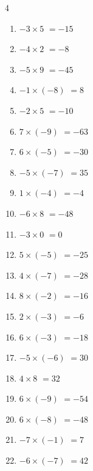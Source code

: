 \begin{multicols}{4}
\begin{enumerate}
  \item $-3\times 5$
        $=-15$

  \item $-4\times 2$
        $=-8$

  \item $-5\times 9$
        $=-45$

  \item $-1\times (-8)$
        $=8$

  \item $-2\times 5$
        $=-10$

  \item $7\times (-9)$
        $=-63$

  \item $6\times (-5)$
        $=-30$

  \item $-5\times (-7)$
        $=35$

  \item $1\times (-4)$
        $=-4$

  \item $-6\times 8$
        $=-48$

  \item $-3\times 0$
        $=0$

  \item $5\times (-5)$
        $=-25$

  \item $4\times (-7)$
        $=-28$

  \item $8\times (-2)$
        $=-16$

  \item $2\times (-3)$
        $=-6$

  \item $6\times (-3)$
        $=-18$

  \item $-5\times (-6)$
        $=30$

  \item $4\times 8$
        $=32$

\columnbreak %

\resetques

  \item $6\times (-9)$
        $=-54$

  \item $6\times (-8)$
        $=-48$

  \item $-7\times (-1)$
        $=7$

  \item $-6\times (-7)$
        $=42$


\end{enumerate}
\end{multicols}
